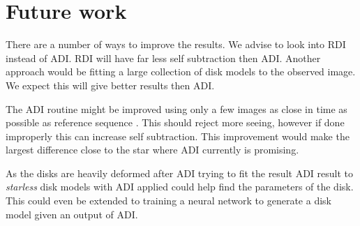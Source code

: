\chapter{Future work}
\label{chap:future}

There are a number of ways to improve the results. We advise to look into \ac{RDI} instead of \ac{ADI}. \ac{RDI} will have far less self subtraction then \ac{ADI}. Another approach would be fitting a large collection of disk models to the observed image. We expect this will give better results then \ac{ADI}.

The \ac{ADI} routine might be improved using only a few images as close in time as possible as reference sequence \cite{Marois_2006}. This should reject more seeing, however if done improperly this can increase self subtraction. This improvement would make the largest difference close to the star where \ac{ADI} currently is promising.

As the disks are heavily deformed after \ac{ADI} trying to fit the result \ac{ADI} result to \textit{starless} disk models with \ac{ADI} applied could help find the parameters of the disk. This could even be extended to training a neural network to generate a disk model given an output of \ac{ADI}.
